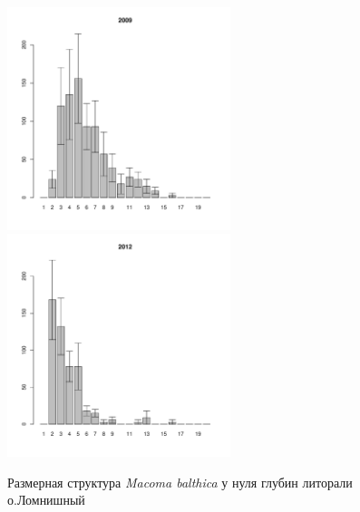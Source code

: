 \documentclass[12pt, a4paper]{article}
\begin{document}
\begin{figure}[h]

\begin{multicols}{2}
\hfill
\includegraphics[width=65mm]{../White_Sea/Lomnishniy/Lomnishniy_2009_.pdf}
\hfill
\includegraphics[width=65mm]{../White_Sea/Lomnishniy/Lomnishniy_2012_.pdf}
\end{multicols}



\caption{Размерная структура {\it Macoma balthica} у нуля глубин литорали о.Ломнишный}
\label{ris:size_str_Lomnishniy}
\end{figure}
\end{document}
